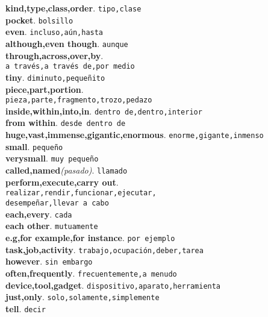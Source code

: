 \documentclass[twocolumn]{article}
\begin{document}
	\textsf{\textbf{kind,type,class,order}}. \texttt{tipo,clase}\\
	\textsf{\textbf{pocket}}. \texttt{bolsillo}\\
	\textsf{\textbf{even}}. \texttt{incluso,a\'un,hasta}\\
	\textsf{\textbf{although,even though}}. \texttt{aunque}\\ 
	\textsf{\textbf{through,across,over,by}}.\\\texttt{a trav\'es,a trav\'es de,por medio}\\  
	\textsf{\textbf{tiny}}. \texttt{diminuto,peque\~nito}\\ 
	\textsf{\textbf{piece,part,portion}}.\\\texttt{pieza,parte,fragmento,trozo,pedazo}\\
	\textsf{\textbf{inside,within,into,in}}. \texttt{dentro de,dentro,interior}\\
	\textsf{\textbf{from within}}. \texttt{desde dentro de}\\
	\textsf{\textbf{huge,vast,immense,gigantic,enormous}}. \texttt{enorme,gigante,inmenso}\\
	\textsf{\textbf{small}}. \texttt{peque\~no}\\
	\textsf{\textbf{verysmall}}. \texttt{muy peque\~no}\\
	\textsf{\textbf{called,named}{\scriptsize \textsl{(pasado)}}}. \texttt{llamado}\\
	\textsf{\textbf{perform,execute,carry out}}.\\\texttt{realizar,rendir,funcionar,ejecutar,\\desempe\~nar,llevar a cabo}\\
	\textsf{\textbf{each,every}}. \texttt{cada}\\
	\textsf{\textbf{each other}}. \texttt{mutuamente}\\
	\textsf{\textbf{e.g,for example,for instance}}. \texttt{por ejemplo}\\
	\textsf{\textbf{task,job,activity}}. \texttt{trabajo,ocupaci\'on,deber,tarea}\\
	\textsf{\textbf{however}}. \texttt{sin embargo}\\
	\textsf{\textbf{often,frequently}}. \texttt{frecuentemente,a menudo}\\
	\textsf{\textbf{device,tool,gadget}}. \texttt{dispositivo,aparato,herramienta}\\
	\textsf{\textbf{just,only}}. \texttt{solo,solamente,simplemente}\\
	\textsf{\textbf{tell}}. \texttt{decir}\\
\end{document}
